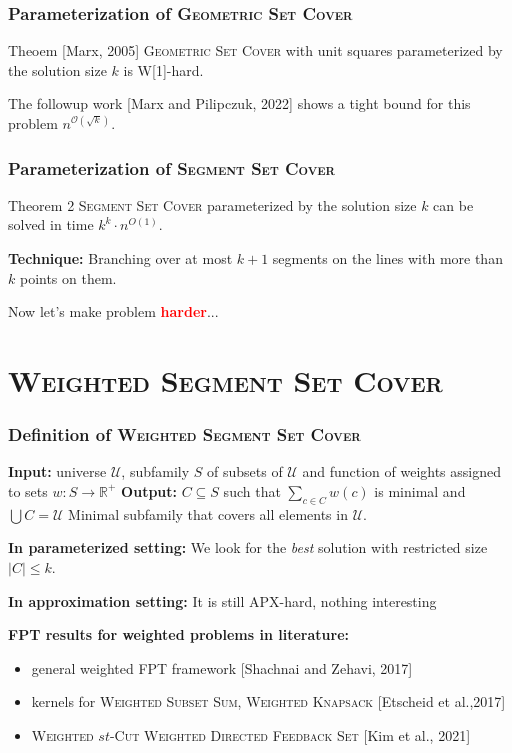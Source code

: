 \documentclass{beamer}
\begin{document}
\begin{frame}
\frametitle{Parameterization of \textsc{Geometric Set Cover}}
\begin{block}{Theoem [Marx, 2005]}
	\textsc{Geometric Set Cover} 
	with unit squares parameterized by the solution size $k$
	is W[1]-hard.
\end{block}

The followup work [Marx and Pilipczuk, 2022]
shows a tight bound for this problem $n^{\mathcal{O}(\sqrt{k})}$.

\end{frame}

\begin{frame}
\frametitle{Parameterization of \textsc{Segment Set Cover}}
\begin{block}{Theorem 2}
	\textsc{Segment Set Cover} parameterized by the solution size $k$
	can be solved in time $k^k \cdot n^{O(1)}$.
\end{block}

\textbf{Technique:} Branching over at most $k+1$
segments on the lines with more than $k$ points on them.

\pause

\bigskip

Now let's make problem \textcolor{red}{\textbf{harder}}...

\end{frame}

\section{\textsc{Weighted Segment Set Cover}} 

\begin{frame}
\frametitle{Definition of \textsc{Weighted Segment Set Cover}}

\textbf{Input:} universe $\mathcal{U}$,
subfamily $S$ of subsets of $\mathcal{U}$
and function of weights assigned to sets $w : S \rightarrow \mathbb{R^+}$
\newline
\textbf{Output:} $C \subseteq S$ such that $\sum_{c \in C} w(c)$ is minimal and
$\bigcup C = \mathcal{U}$
\newline
Minimal subfamily that covers all elements in $\mathcal{U}$.

\pause

\bigskip
\textbf{In parameterized setting:}
We look for the \textit{best} solution with restricted size $|C| \le k$.

\textbf{In approximation setting:}
It is still APX-hard, nothing interesting
\bigskip
\pause

\textbf{FPT results for weighted problems in literature:}
\begin{itemize}
\item general weighted FPT framework {[Shachnai and Zehavi, 2017]}
\item kernels for \textsc{Weighted Subset Sum}, \textsc{Weighted Knapsack} {[Etscheid et al.,2017]}
\item \textsc{Weighted $st$-Cut} \textsc{Weighted Directed Feedback Set} {[Kim et al., 2021]}
\end{itemize}


\end{frame}
\end{document}

